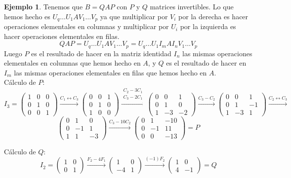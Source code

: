 \documentclass{article}
\theoremstyle{theorem-style}  %
\theoremstyle{definition}
\theoremstyle{example-style}
\newtheorem{example}{Ejemplo}[section]
\begin{document}
\begin{example}
	Tenemos que $B=QAP$ con $P$ y $Q$ matrices invertibles. Lo que hemos hecho es $U_q\dots U_1AV_1\dots V_p$ ya que multiplicar por $V_i$ por la derecha es hacer operaciones elementales en columnas y multiplicar por $U_i$ por la izquierda es hacer operaciones elementales en filas.
	\[ QAP=U_q\dots U_1AV_1\dots V_p=U_q\dots U_1I_mAI_nV_1\dots V_p\]
	Luego $P$ es el resultado de hacer en la matriz identidad $I_n$ las mismas operaciones elementales en columnas que hemos hecho en $A$, y $Q$ es el resultado de hacer en $I_m$ las mismas operaciones elementales en filas que hemos hecho en $A$.\\
	Cálculo de $P$:
	\[ I_3 = \begin{pmatrix}
			1 & 0 & 0 \\
			0 & 1 & 0 \\
			0 & 0 & 1
			\end{pmatrix}\xrightarrow{C_1\leftrightarrow C_3}\begin{pmatrix}
			0 & 0 & 1 \\
			0 & 1 & 0 \\
			1 & 0 & 0
			\end{pmatrix}\xrightarrow{\substack{C_2-3C_1\\C_3-2C_1}}\begin{pmatrix}
			0 & 0 & 1 \\
			0 & 1 & 0 \\
			1 & -3 & -2
			\end{pmatrix}\xrightarrow{C_3-C_2}\begin{pmatrix}
			0 & 0 & 1 \\
			0 & 1 & -1 \\
			1 & -3 & 1
			\end{pmatrix}\xrightarrow{C_2\leftrightarrow C_3}\]
			\[\begin{pmatrix}
			0 & 1 & 0 \\
			0 & -1 & 1 \\
			1 & 1 & -3
			\end{pmatrix}\xrightarrow{C_3-10C_2}\begin{pmatrix}
			0 & 1 & -10 \\
			0 & -1 & 11 \\
			0 & 0 & -13
	\end{pmatrix}=P \]

	Cálculo de $Q$:
	\[I_2= \begin{pmatrix}
			1 & 0\\
			0 & 1
			\end{pmatrix}\xrightarrow{F_2-4F_1}\begin{pmatrix}
			1 & 0\\
			-4 & 1
			\end{pmatrix}\xrightarrow{(-1)F_2}\begin{pmatrix}
			1 & 0\\
			4 & -1
	\end{pmatrix}=Q\]

	\end{example}
\end{document}
